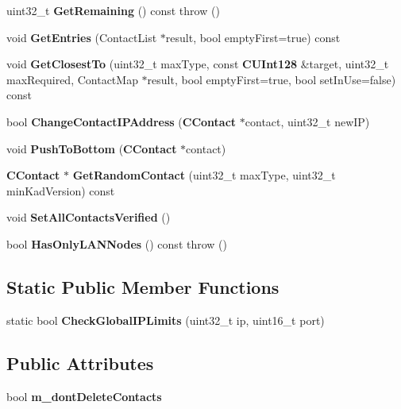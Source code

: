 \begin{DoxyCompactItemize}
\item 
uint32\_\-t {\bfseries GetRemaining} () const   throw ()\label{classKademlia_1_1CRoutingBin_a8f03d2eeb23d70d7299b08c1582c2436}

\item 
void {\bfseries GetEntries} (ContactList $\ast$result, bool emptyFirst=true) const \label{classKademlia_1_1CRoutingBin_ac553ea0393e3082a3d3ea45324d9e059}

\item 
void {\bfseries GetClosestTo} (uint32\_\-t maxType, const {\bf CUInt128} \&target, uint32\_\-t maxRequired, ContactMap $\ast$result, bool emptyFirst=true, bool setInUse=false) const \label{classKademlia_1_1CRoutingBin_aea0043a5e4154dc4cafcb285ba4c6a6b}

\item 
bool {\bfseries ChangeContactIPAddress} ({\bf CContact} $\ast$contact, uint32\_\-t newIP)\label{classKademlia_1_1CRoutingBin_a2540198ca5e518633b6bb322bbfdaefe}

\item 
void {\bfseries PushToBottom} ({\bf CContact} $\ast$contact)\label{classKademlia_1_1CRoutingBin_a1339d38e54fb204725ceec34302579bd}

\item 
{\bf CContact} $\ast$ {\bfseries GetRandomContact} (uint32\_\-t maxType, uint32\_\-t minKadVersion) const \label{classKademlia_1_1CRoutingBin_aa0eaee07d533e46134e6d3125c119517}

\item 
void {\bfseries SetAllContactsVerified} ()\label{classKademlia_1_1CRoutingBin_a45078739976acf71f33d9163378f4e57}

\item 
bool {\bfseries HasOnlyLANNodes} () const   throw ()\label{classKademlia_1_1CRoutingBin_a23a0a70a59de17d1fe758276f7138f87}

\end{DoxyCompactItemize}
\subsection*{Static Public Member Functions}
\begin{DoxyCompactItemize}
\item 
static bool {\bfseries CheckGlobalIPLimits} (uint32\_\-t ip, uint16\_\-t port)\label{classKademlia_1_1CRoutingBin_a4c3c01318bdbe03722f3ebc533755a08}

\end{DoxyCompactItemize}
\subsection*{Public Attributes}
\begin{DoxyCompactItemize}
\item 
bool {\bfseries m\_\-dontDeleteContacts}\label{classKademlia_1_1CRoutingBin_af66215083fa31848e37265a8fce8e92b}

\end{DoxyCompactItemize}
